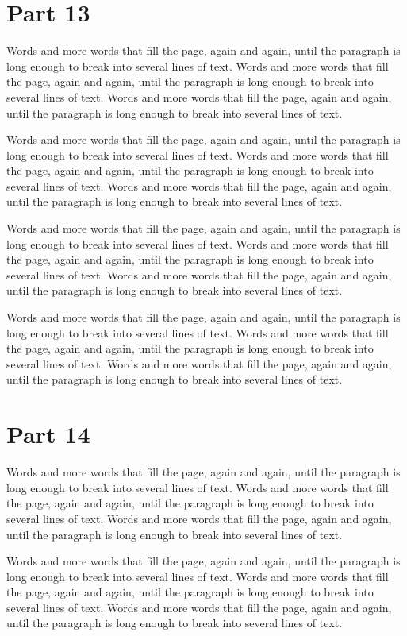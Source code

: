 \documentclass{article}
\begin{document}
\section{Part 13}
Words and more words that fill the page, again and again, until the paragraph is long enough to break into several lines of text. Words and more words that fill the page, again and again, until the paragraph is long enough to break into several lines of text. Words and more words that fill the page, again and again, until the paragraph is long enough to break into several lines of text. 

Words and more words that fill the page, again and again, until the paragraph is long enough to break into several lines of text. Words and more words that fill the page, again and again, until the paragraph is long enough to break into several lines of text. Words and more words that fill the page, again and again, until the paragraph is long enough to break into several lines of text. 

Words and more words that fill the page, again and again, until the paragraph is long enough to break into several lines of text. Words and more words that fill the page, again and again, until the paragraph is long enough to break into several lines of text. Words and more words that fill the page, again and again, until the paragraph is long enough to break into several lines of text. 

Words and more words that fill the page, again and again, until the paragraph is long enough to break into several lines of text. Words and more words that fill the page, again and again, until the paragraph is long enough to break into several lines of text. Words and more words that fill the page, again and again, until the paragraph is long enough to break into several lines of text. 

\section{Part 14}
Words and more words that fill the page, again and again, until the paragraph is long enough to break into several lines of text. Words and more words that fill the page, again and again, until the paragraph is long enough to break into several lines of text. Words and more words that fill the page, again and again, until the paragraph is long enough to break into several lines of text. 

Words and more words that fill the page, again and again, until the paragraph is long enough to break into several lines of text. Words and more words that fill the page, again and again, until the paragraph is long enough to break into several lines of text. Words and more words that fill the page, again and again, until the paragraph is long enough to break into several lines of text. 
\end{document}
